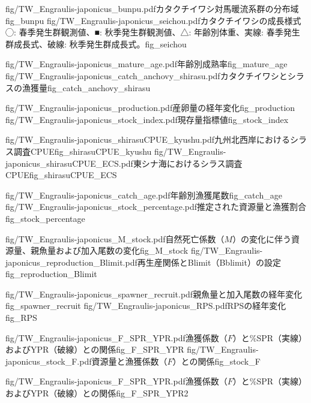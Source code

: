 \TwoOfSixFigs
{fig/TW_Engraulis-japonicus_bunpu.pdf}{カタクチイワシ対馬暖流系群の分布域}{fig_bunpu}
{fig/TW_Engraulis-japonicus_seichou.pdf}{カタクチイワシの成長様式\newline◯: 春季発生群観測値、■: 秋季発生群観測値、△: 年齢別体重、実線: 春季発生群成長式、破線: 秋季発生群成長式。}{fig_seichou}

\TwoOfSixFigs
{fig/TW_Engraulis-japonicus_mature_age.pdf}{年齢別成熟率}{fig_mature_age}
{fig/TW_Engraulis-japonicus_catch_anchovy_shirasu.pdf}{カタクチイワシとシラスの漁獲量}{fig_catch_anchovy_shirasu}

\TwoOfSixFigs
{fig/TW_Engraulis-japonicus_production.pdf}{産卵量の経年変化}{fig_production}
{fig/TW_Engraulis-japonicus_stock_index.pdf}{現存量指標値}{fig_stock_index}

\TwoOfSixFigs
{fig/TW_Engraulis-japonicus_shirasuCPUE_kyushu.pdf}{九州北西岸におけるシラス調査CPUE}{fig_shirasuCPUE_kyushu}
{fig/TW_Engraulis-japonicus_shirasuCPUE_ECS.pdf}{東シナ海におけるシラス調査CPUE}{fig_shirasuCPUE_ECS}

\TwoOfSixFigs
{fig/TW_Engraulis-japonicus_catch_age.pdf}{年齢別漁獲尾数}{fig_catch_age}
{fig/TW_Engraulis-japonicus_stock_percentage.pdf}{推定された資源量と漁獲割合}{fig_stock_percentage}

\TwoOfSixFigs
{fig/TW_Engraulis-japonicus_M_stock.pdf}{自然死亡係数（$M$）の変化に伴う資源量、親魚量および加入尾数の変化}{fig_M_stock}
{fig/TW_Engraulis-japonicus_reproduction_Blimit.pdf}{再生産関係とBlimit（Bblimit）の設定}{fig_reproduction_Blimit}

\TwoOfSixFigs
{fig/TW_Engraulis-japonicus_spawner_recruit.pdf}{親魚量と加入尾数の経年変化}{fig_spawner_recruit}
{fig/TW_Engraulis-japonicus_RPS.pdf}{RPSの経年変化}{fig_RPS}

\TwoOfSixFigs
{fig/TW_Engraulis-japonicus_F_SPR_YPR.pdf}{漁獲係数（$F$）と\%SPR（実線）およびYPR（破線）との関係}{fig_F_SPR_YPR}
{fig/TW_Engraulis-japonicus_stock_F.pdf}{資源量と漁獲係数（$F$）との関係}{fig_stock_F}

\OneOfSixFigs
{fig/TW_Engraulis-japonicus_F_SPR_YPR.pdf}{漁獲係数（$F$）と\%SPR（実線）およびYPR（破線）との関係}{fig_F_SPR_YPR2}
